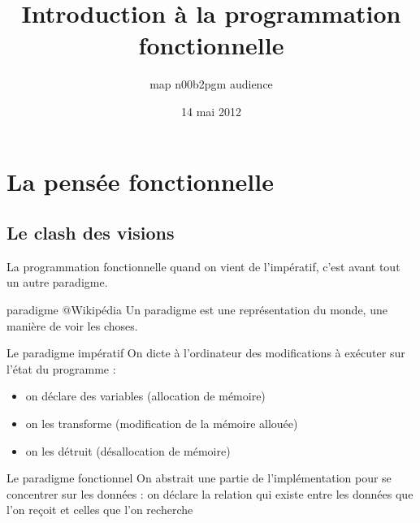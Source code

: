 \documentclass[handout]{beamer}
\title{Introduction à la programmation fonctionnelle}
\subtitle{map n00b2pgm audience}
\institute{Nantes Functional Programming Group}
\date{14 mai 2012}
\begin{document}
 \frame{\titlepage}





 \section{La pensée fonctionnelle}
 \subsection{Le clash des visions}
  \begin{frame}
   La programmation fonctionnelle quand on vient de l'impératif, c'est avant
   tout un autre paradigme.
   \begin{block}{paradigme @Wikipédia}
   Un paradigme est une représentation du monde, une manière de voir les choses.
   \end{block}
  \end{frame}


  \begin{frame}{Le paradigme impératif}
   On dicte à l'ordinateur des modifications à exécuter sur l'état du
   programme :
   \pause
   \begin{itemize}[<+->]
    \item on déclare des variables (allocation de mémoire)
    \item on les transforme (modification de la mémoire allouée)
    \item on les détruit (désallocation de mémoire)
   \end{itemize}
  \end{frame}


  \begin{frame}{Le paradigme fonctionnel}
   On abstrait une partie de l'implémentation pour se concentrer sur les
   données : on déclare la relation qui existe entre les données que l'on reçoit
   et celles que l'on recherche
  \end{frame}
\end{document}
